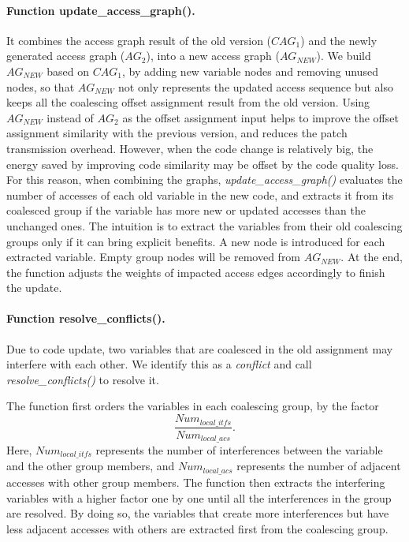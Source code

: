 \paragraph{Function  update\_access\_graph().} It combines the access graph result of the old version ($\textit{CAG}_1$) and the newly generated access graph ($\textit{AG}_2$), into a new access graph ($\textit{AG}_\textit{NEW}$).
We build $\textit{AG}_\textit{NEW}$ based on $\textit{CAG}_1$, by adding new variable nodes and removing unused nodes, so that
$\textit{AG}_\textit{NEW}$ not only represents the updated access sequence but also keeps all the coalescing offset assignment result from the old version.
Using $\textit{AG}_\textit{NEW}$ instead of $\textit{AG}_2$ as the offset assignment input helps to improve the offset assignment similarity with the previous version, and reduces the patch transmission overhead.
However, when the code change is relatively big, the energy saved by improving code similarity may be offset by the code quality loss. 
For this reason, when combining the graphs, {\it update\_access\_graph()} evaluates the number of accesses of each old variable in the new code, and extracts it from its coalesced group if the variable has more new or updated accesses than the unchanged ones. 
The intuition is to extract the variables from their old coalescing groups only if it can bring explicit benefits. 
A new node is introduced for each extracted variable. Empty group nodes will be removed from $\textit{AG}_\textit{NEW}$.
At the end, the function adjusts the weights of impacted access edges accordingly to finish the update.


\paragraph{Function resolve\_conflicts().}Due to code update, two variables that are coalesced in the old assignment may interfere with each other. We identify this as a {\em conflict} and call {\it resolve\_conflicts()} to resolve it. 

The function first orders the variables in each coalescing group, by the factor 
$$\frac{\textit{Num}_{\textit{local}\_\textit{itfs}}}{\textit{Num}_{\textit{local}\_\textit{acs}}} .$$
Here, $\textit{Num}_{\textit{local}\_\textit{itfs}}$ represents the number of interferences between the variable and the other group members, and $\textit{Num}_{\textit{local}\_\textit{acs}}$ represents the number of adjacent accesses with other group members. The function then extracts the interfering variables with a higher factor one by one until all the interferences in the group are resolved. By doing so, the variables that create more interferences but have less adjacent accesses with others are extracted first from the coalescing group. 

